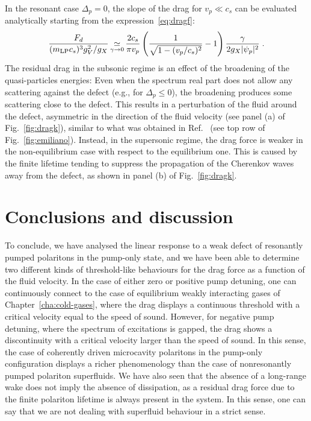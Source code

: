 In the resonant case $\Delta_p=0$, the slope of the
drag for $v_p \ll c_s$ can be evaluated analytically starting from the
expression~\eqref{eq:dragf}:
%
\begin{equation*}
    \frac{F_d}{(m_{\text{LP}}c_s)^3 g_V^2/g_X} \mathop{\simeq}\limits_{\gamma \to 0} \frac{2 c_s}{\pi
      v_p} \left( \frac{1}{ \sqrt{1-(v_p/c_s)^2}} - 1 \right)
    \frac{\gamma}{2g_X |\psi_p|^2} \; .
\end{equation*}
%
The residual drag in the subsonic regime is an effect of the
broadening of the quasi-particles energies: Even when the spectrum
real part does not allow any scattering against the defect (e.g., for
$\Delta_p \le 0$), the broadening produces some scattering close to
the defect. This results in a perturbation of the fluid around the
defect, asymmetric in the direction of the fluid velocity (see panel
(a) of Fig.~\ref{fig:dragk}), similar to what was obtained in
Ref.~\cite{Cancellieri_2010} (see top row of
Fig.~\ref{fig:emiliano}). Instead, in the supersonic regime, the drag
force is weaker in the non-equilibrium case with respect to the
equilibrium one. This is caused by the finite lifetime tending to
suppress the propagation of the Cherenkov waves away from the defect,
as shown in panel (b) of Fig.~\ref{fig:dragk}.


\section{Conclusions and discussion}
\label{sec:concl}
%
To conclude, we have analysed the linear response to a weak defect of
resonantly pumped polaritons in the pump-only state, and we have been
able to determine two different kinds of threshold-like behaviours for
the drag force as a function of the fluid velocity. In the case of
either zero or positive pump detuning, one can continuously connect to
the case of equilibrium weakly interacting gases of
Chapter~\ref{cha:cold-gases}, where the drag displays a continuous
threshold with a critical velocity equal to the speed of
sound. However, for negative pump detuning, where the spectrum of
excitations is gapped, the drag shows a discontinuity with a critical
velocity larger than the speed of sound. In this sense, the case of
coherently driven microcavity polaritons in the pump-only
configuration displays a richer phenomenology than the case of
nonresonantly pumped polariton superfluids. We have also seen that the
absence of a long-range wake does not imply the absence of
dissipation, as a residual drag force due to the finite polariton
lifetime is always present in the system. In this sense, one can say
that we are not dealing with superfluid behaviour in a strict sense.

